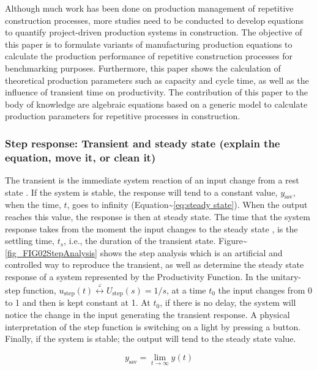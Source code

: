 \documentclass{article}
\begin{document}
Although much work has been done on production management of repetitive construction processes, more studies need to be conducted to develop equations to quantify project-driven production systems in construction.
The objective of this paper is to formulate variants of manufacturing production equations to calculate the production performance of repetitive construction processes for benchmarking purposes.
Furthermore, this paper shows the calculation of theoretical production parameters such as capacity and cycle time, as well as the influence of transient time on productivity.
The contribution of this paper to the body of knowledge are algebraic equations based on a generic model to calculate production parameters for repetitive processes in construction.

\subsubsection{Step response: Transient and steady state (explain the equation, move it, or clean it)}
\label{sec:org849468a}

The transient is the immediate system reaction of an input change from a rest state \citep{Ogata2010}.
If the system is stable, the response will tend to a constant value, \(y_{\mbox{ssv}}\), when the time, \(t\), goes to infinity (Equation\textasciitilde{}\ref{eq:steady state}).
When the output reaches this value, the response is then at steady state.
The time that the system response takes from the moment the input changes to the steady state \citep{Nise2010,Ogata2010}, is the settling time, \(t_s\), i.e., the duration of the transient state.
Figure\textasciitilde{}\ref{fig_FIG02StepAnalysis} shows the step analysis which is an artificial and controlled way to reproduce the transient, as well as determine the steady state response of a system represented by the Productivity Function.
In the unitary-step function, \(u_{\mbox{step}}(t) \overset{\underset{\mathrm{\mathcal{L}}}{}}{\leftrightarrow} U_{\mbox{step}}(s) = 1/s\), at a time \(t_0\) the input changes from 0 to 1 and then is kept constant at 1.
At \(t_0\), if there is no delay, the system will notice the change in the input generating the transient response.
A physical interpretation of the step function is switching on a light by pressing a button.
Finally, if the system is stable; the output will tend to the steady state value.

\begin{equation}\label{eq:steady state}
	y_{\mbox{ssv}} = \lim_{t\rightarrow \infty} y(t)
\end{equation}
\end{document}

